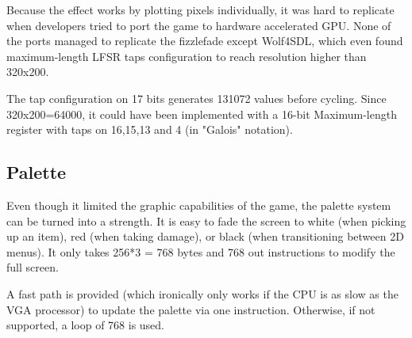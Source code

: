 Because the effect works by plotting pixels individually, it was hard to replicate when developers tried to port the game to hardware accelerated GPU. None of the ports managed to replicate the fizzlefade except Wolf4SDL, which even found maximum-length LFSR taps configuration to reach resolution higher than 320x200.\\
\par
{} The tap configuration on 17 bits generates 131072 values before cycling. Since 320x200=64000, it could have been implemented with a 16-bit Maximum-length register with taps on 16,15,13 and 4 (in "Galois" notation).










\subsection{Palette}
Even though it limited the graphic capabilities of the game, the palette system can be turned into a strength. It is easy to fade the screen to white (when picking up an item), red (when taking damage), or black (when transitioning between 2D menus). It only takes 256*3 = 768 bytes and 768 out instructions to modify the full screen.\\
\par

 \hspace{40pt}\par
 \vspace{10pt}
 \hspace{40pt}\par
 \vspace{10pt}
 \hspace{40pt}\par
\pagebreak

A fast path is provided (which ironically only works if the CPU is as slow as the VGA processor) to update the palette via one  instruction. Otherwise, if not supported, a loop of 768  is used.\\
\par
\begin{minipage}{\linewidth}

\end{minipage}








